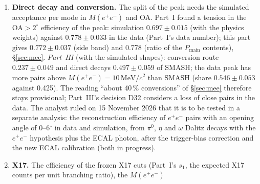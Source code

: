 \documentclass[11pt,a4paper]{article}
\newcommand{\piz}{\ensuremath{\pi^{0}}\xspace}
\newcommand{\ee}{\ensuremath{e^{+}e^{-}}\xspace}
\newcommand{\pipi}{\ensuremath{\pi^{+}\pi^{-}}\xspace}
\newcommand{\ppee}{\ensuremath{\pi^{+}\pi^{-}e^{+}e^{-}}\xspace}
\newcommand{\Mee}{\ensuremath{M(e^{+}e^{-})}\xspace}
\newcommand{\MeVcc}{\ensuremath{\mathrm{MeV}/c^{2}}\xspace}
\newcommand{\Pmain}{\ensuremath{P_{\mathrm{main}}}\xspace}
\begin{document}
\begin{enumerate}
      ratio, so both components must be subtracted with the simulated material before the ratio gives $\mathrm{BR}(\eta\to\ppee)$ relative to
      $\mathrm{BR}(\eta\to\pipi\piz)\,\mathrm{BR}(\piz\to\ee\gamma)$; the tagged $\eta$ is a second reference once the ECAL efficiency and
      calibration are known. \emph{Part~III} (ECAL study): the full reconstruction with the ECAL photon keeps about 12\,\% of the bump, as a
      clean peak; the data hold $1.16\pm0.21$ of the prediction with the simulated photon energy scale and $0.84\pm0.15$ with a data-like one
      (errors overestimated); before it can be a measurement it needs the photon energy scale and resolution in data and simulation, the module
      efficiency (65\,\% in the simulation, not explained), a photon cut that does not depend on START (or a simulated START efficiency) and at
      least 10 times more simulated $\eta\to\pipi\piz$. \emph{Part~III}: the double ratio peak/bump from the edge is $0.97\pm0.10\pm0.17\pm0.12$
      (data over SMASH; without the peak-composition term; with it, as quoted for the $u$ edge, $0.97\pm0.37$); the
      branching ratio from the template fits of the pairs above 20\,\MeVcc relative to the bump, $2.67\times10^{-4}$, is a cross-check only
      (130\,\% total uncertainty).
\item \textbf{Direct decay and conversion.} The split of the peak needs the simulated acceptance per mode in \Mee and OA. Part~I found a tension
      in the OA$>2^\circ$ efficiency of the peak: simulation $0.697\pm0.015$ (with the physics weights) against $0.778\pm0.033$ in the data
      (Part~I's data number); this part gives $0.772\pm0.037$ (side band) and 0.778 (ratio of the \Pmain contents), \S\ref{sec:mee}.
      \emph{Part~III} (with the simulated shapes): conversion route $0.237\pm0.049$ and direct decays $0.497\pm0.059$ of SMASH; the data peak has
      more pairs above $\Mee=10$\,\MeVcc than SMASH (share $0.546\pm0.053$ against 0.425). The reading ``about 40\,\% conversions'' of
      \S\ref{sec:mee} therefore stays provisional; Part~III's decision D32 considers a loss of close pairs in the data. The analyst ruled on
      15 November 2026 that it is to be tested in a separate analysis: the reconstruction efficiency of \ee pairs with an opening angle of
      0--6$^\circ$ in data and simulation, from \piz, $\eta$ and $\omega$ Dalitz decays with the \ee hypothesis plus the ECAL photon, after the
      trigger-bias correction and the new ECAL calibration (both in progress).
\item \textbf{X17.} The efficiency of the frozen X17 cuts (Part~I's $s_1$, the expected X17 counts per unit branching ratio), the \Mee

\end{enumerate}
\end{document}
